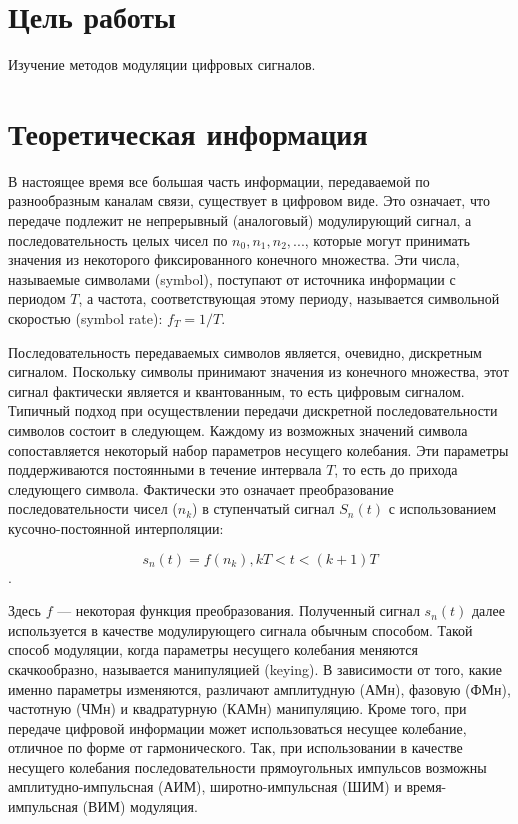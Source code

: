 







\section{Цель работы}
Изучение методов модуляции цифровых сигналов.

\section{Теоретическая информация}

В настоящее время все большая часть информации, передаваемой по разнообразным каналам связи, существует в цифровом виде. Это означает, что передаче подлежит не непрерывный (аналоговый) модулирующий сигнал, а последовательность целых чисел по $ n_0, n_1,  n_2, ... $, которые могут принимать значения из некоторого фиксированного конечного множества. Эти числа, называемые символами (symbol), поступают от источника информации с периодом $ T $, а частота, соответствующая этому периоду, называется символьной скоростью (symbol rate): $ f_T =  1/T $.

Последовательность передаваемых символов является, очевидно, дискретным сигналом. Поскольку символы принимают значения из конечного множества, этот сигнал фактически является и квантованным, то есть цифровым сигналом. 
Типичный подход при осуществлении передачи дискретной последовательности символов состоит в следующем. Каждому из возможных значений символа сопоставляется некоторый набор параметров несущего колебания. Эти параметры поддерживаются постоянными в течение интервала $ T $, то есть до прихода следующего символа. Фактически это означает преобразование последовательности чисел (${n_k}$) в ступенчатый сигнал $ S_n(t) $ с использованием кусочно-постоянной интерполяции:

$$s_n(t) = f(n_k), kT < t < (k + 1)T$$. 

Здесь $f$ — некоторая функция преобразования. Полученный сигнал $s_n(t)$ далее используется в качестве модулирующего сигнала обычным способом.
Такой способ модуляции, когда параметры несущего колебания меняются скачкообразно, называется манипуляцией (keying). В зависимости от того, какие именно параметры изменяются, различают амплитудную (АМн), фазовую (ФМн), частотную (ЧМн) и квадратурную (КАМн) манипуляцию. Кроме того, при передаче цифровой информации может использоваться несущее колебание, отличное по форме от гармонического. Так, при использовании в качестве несущего колебания последовательности прямоугольных импульсов возможны амплитудно-импульсная (АИМ), широтно-импульсная (ШИМ) и время-импульсная (ВИМ) модуляция.


